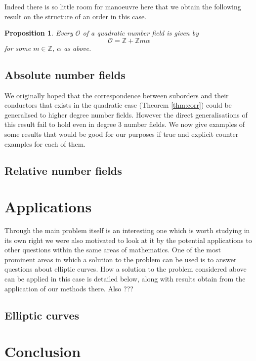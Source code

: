 \documentclass[11pt,a4paper]{report}
\newtheorem{prop}{Proposition}
\theoremstyle{definition}
\begin{document}
Indeed there is so little room for manoeuvre here that we obtain the following result on the structure of an order in this case.

\begin{prop}
Every $\mathcal{O}$ of a quadratic number field is given by 
\[\mathcal{O} = \mathbb{Z} + \mathbb{Z}m\alpha\]
for some $m\in \mathbb{Z}$, $\alpha$ as above.
\end{prop}


\section{Absolute number fields}

We originally hoped that the correspondence between suborders and their conductors that exists in the quadratic case (Theorem \ref{thm:corr}) could be generalised to higher degree number fields.
However the direct generalisations of this result fail to hold even in degree 3 number fields.
We now give examples of some results that would be good for our purposes if true and explicit counter examples for each of them.


\section{Relative number fields}



\chapter{Applications}

Through the main problem itself is an interesting one which is worth studying in its own right we were also motivated to look at it by the potential applications to other questions within the same areas of mathematics.
One of the most prominent areas in which a solution to the problem can be used is to answer questions about elliptic curves.
How a solution to the problem considered above can be applied in this case is detailed below, along with results obtain from the application of our methods there.
Also ???

\section{Elliptic curves}
\label{sec:ell}

\chapter{Conclusion}
\end{document}
